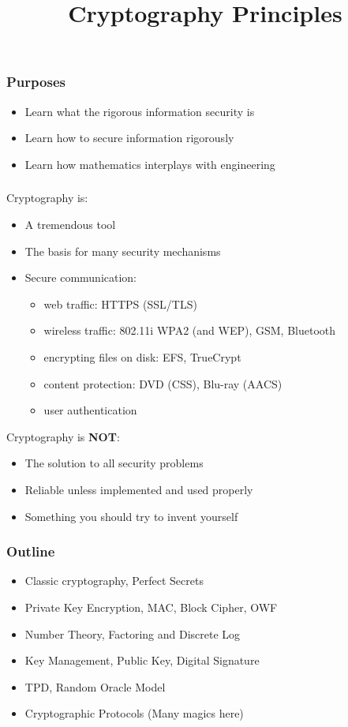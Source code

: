 

\title{Cryptography Principles}


\maketitle
\begin{frame}\frametitle{Purposes}
\begin{itemize}
\item Learn what the rigorous information security is
\item Learn how to secure information rigorously
\item Learn how mathematics interplays with engineering
\end{itemize}
\end{frame}
\begin{frame}\frametitle{}
Cryptography is:
\begin{itemize}
\item A tremendous tool
\item The basis for many security mechanisms
\item Secure communication: 
\begin{itemize}
\item web traffic: HTTPS (SSL/TLS)
\item wireless traffic: 802.11i WPA2 (and WEP), GSM, Bluetooth
\item encrypting files on disk: EFS, TrueCrypt
\item content protection: DVD (CSS), Blu-ray (AACS)
\item user authentication
\end{itemize}
\end{itemize}
Cryptography is \textbf{NOT}:
\begin{itemize}
\item The solution to all security problems
\item Reliable unless implemented and used properly
\item Something you should try to invent yourself	
\end{itemize}
\end{frame}
\begin{frame}\frametitle{Outline}
\begin{itemize}
\item Classic cryptography, Perfect Secrets
\item Private Key Encryption, MAC, Block Cipher, OWF
\item Number Theory, Factoring and Discrete Log
\item Key Management, Public Key, Digital Signature
\item TPD, Random Oracle Model
\item Cryptographic Protocols (Many magics here)
\end{itemize}	
\end{frame}
